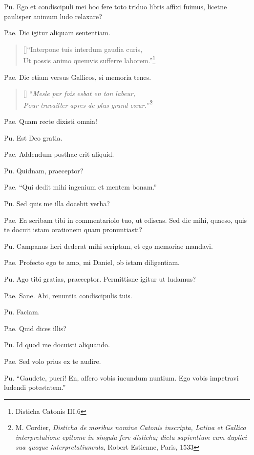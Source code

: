 \documentclass{article}
\newcommand{\fr}[1]{\foreignlanguage{french}{\emph{#1}}}
\begin{document}
Pu. Ego et condiscipuli mei hoc fere toto triduo libris affixi fuimus, licetne paulisper animum ludo relaxare?

Pae. Dic igitur aliquam sententiam.

\begin{verse}[\versewidth]``Interpone tuis interdum gaudia curis, \\ Ut possis animo quemvis sufferre laborem.''\footnote{Disticha Catonis III.6}\end{verse}

Pae. Dic etiam versus Gallicos, si memoria tenes.

\begin{verse}[\versewidth] ``\fr{Mesle par fois esbat en ton labeur,\\ Pour travailler apres de plus grand cœur.}''\footnote{M. Cordier, \emph{Disticha de moribus nomine Catonis inscripta, Latina et Gallica interpretatione epitome in singula fere disticha; dicta sapientium cum duplici sua quoque interpretatiuncula}, Robert Estienne, Paris, 1533}\end{verse}

Pae. Quam recte dixisti omnia!

Pu. Est Deo gratia.

Pae. Addendum posthac erit aliquid.

Pu. Quidnam, praeceptor?

Pae. ``Qui dedit mihi ingenium et mentem bonam.''

Pu. Sed quis me illa docebit verba?

Pae. Ea scribam tibi in commentariolo tuo, ut ediscas. Sed dic mihi, quaeso, quis te docuit istam orationem quam pronuntiasti?

Pu. Campanus heri dederat mihi scriptam, et ego memoriae mandavi.

Pae. Profecto ego te amo, mi Daniel, ob istam diligentiam.

Pu. Ago tibi gratias, praeceptor. Permittisne igitur ut ludamus?

Pae. Sane. Abi, renuntia condiscipulis tuis.

Pu. Faciam.

Pae. Quid dices illis?

Pu. Id quod me docuisti aliquando.

Pae. Sed volo prius ex te audire.

Pu. ``Gaudete, pueri! En, affero vobis iucundum nuntium. Ego vobis impetravi ludendi potestatem.''
\end{document}
